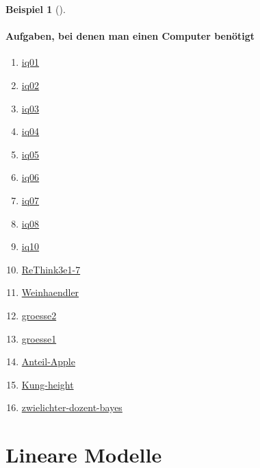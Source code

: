 \documentclass[
  ngerman,
  letterpaper,
  twoside,
  open=any]{scrbook}
\providecommand{\tightlist}{%
  \setlength{\itemsep}{0pt}\setlength{\parskip}{0pt}}\usepackage{longtable,booktabs,array}
\theoremstyle{definition}
\newtheorem{example}{Beispiel}[chapter]
\theoremstyle{plain}
\theoremstyle{definition}
\theoremstyle{definition}
\theoremstyle{remark}
\begin{document}
\begin{example}[]
\subsection{Aufgaben, bei denen man einen Computer
benötigt}\label{aufgaben-bei-denen-man-einen-computer-benuxf6tigt}

\begin{enumerate}
\def\labelenumi{\arabic{enumi}.}
\tightlist
\item
  \href{https://datenwerk.netlify.app/posts/iq01/iq01.html}{iq01}
\item
  \href{https://datenwerk.netlify.app/posts/iq02/iq02.html}{iq02}
\item
  \href{https://datenwerk.netlify.app/posts/iq03/iq03.html}{iq03}
\item
  \href{https://datenwerk.netlify.app/posts/iq04/iq04.html}{iq04}
\item
  \href{https://datenwerk.netlify.app/posts/iq05/iq05.html}{iq05}
\item
  \href{https://datenwerk.netlify.app/posts/iq06/iq06.html}{iq06}
\item
  \href{https://datenwerk.netlify.app/posts/iq07/iq07.html}{iq07}
\item
  \href{https://datenwerk.netlify.app/posts/iq08/iq08.html}{iq08}
\item
  \href{https://datenwerk.netlify.app/posts/iq10/iq10.html}{iq10}
\item
  \href{https://datenwerk.netlify.app/posts/rethink3e1-7/rethink3e1-7}{ReThink3e1-7}
\item
  \href{https://datenwerk.netlify.app/posts/weinhaendler/weinhaendler}{Weinhaendler}
\item
  \href{https://datenwerk.netlify.app/posts/groesse02/groesse02}{groesse2}
\item
  \href{https://datenwerk.netlify.app/posts/groesse01/groesse01}{groesse1}
\item
  \href{https://datenwerk.netlify.app/posts/anteil-apple/anteil-apple}{Anteil-Apple}
\item
  \href{https://datenwerk.netlify.app/posts/kung-height/kung-height}{Kung-height}
\item
  \href{https://datenwerk.netlify.app/posts/zwielichter-dozent-bayes/zwielichter-dozent-bayes}{zwielichter-dozent-bayes}
\end{enumerate}

\part{Lineare Modelle}


\end{example}
\end{document}
